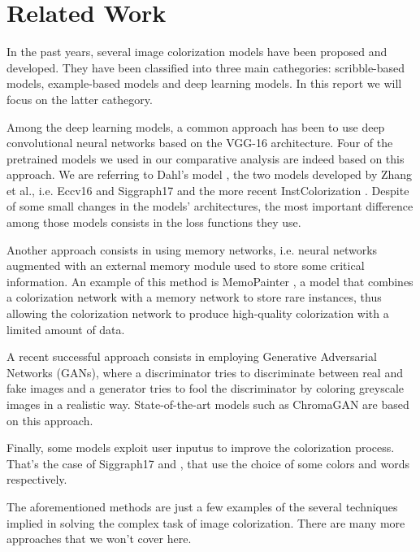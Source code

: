 \section{Related Work}
In the past years, several image colorization models have been proposed and developed. They have been classified into
three main cathegories: scribble-based models, example-based models and deep learning models. In this report we will
focus on the latter cathegory.

Among the deep learning models, a common approach has been to use deep convolutional neural networks based on the
VGG-16 architecture. Four of the pretrained models we used in our comparative analysis are indeed based on this
approach. We are referring to Dahl's model \cite{dahl}, the two models developed by Zhang et al., i.e.
Eccv16 \cite{zhang} and Siggraph17 \cite{siggraph} and the more recent InstColorization \cite{su}. Despite of some
small changes in the models' architectures, the most important difference among those models consists in the loss
functions they use.

Another approach consists in using memory networks, i.e. neural networks augmented with an external
memory module used to store some critical information. An example of this method is MemoPainter \cite{animation},
a model that combines a colorization network with a memory network to store rare instances, thus allowing the
colorization network to produce high-quality colorization with a limited amount of data.

A recent successful approach consists in employing Generative Adversarial Networks (GANs), where a discriminator
tries to discriminate between real and fake images and a generator tries to fool the discriminator by coloring
greyscale images in a realistic way. State-of-the-art models such as ChromaGAN \cite{chromagan} are based on this
approach.

Finally, some models exploit user inputus to improve the colorization process. That's the case of
Siggraph17 \cite{siggraph} and \cite{language}, that use the choice of some colors and words respectively.

The aforementioned methods are just a few examples of the several techniques implied in solving the complex task
of image colorization. There are many more approaches that we won't cover here.
